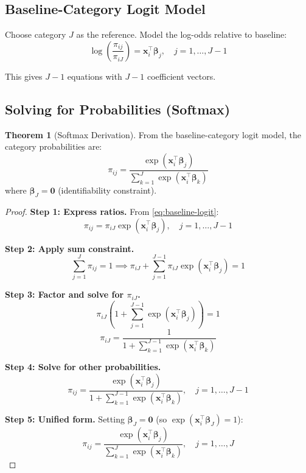 \documentclass[11pt,letterpaper]{article}
\theoremstyle{definition}
\newtheorem{theorem}{Theorem}[section]
\newcommand{\bb}{\boldsymbol{\beta}}
\begin{document}
\subsection{Baseline-Category Logit Model}

Choose category $J$ as the reference. Model the log-odds relative to baseline:
\begin{equation}
    \log\left(\frac{\pi_{ij}}{\pi_{iJ}}\right) = \mathbf{x}_i^\top \bb_j, \quad j = 1, \ldots, J-1
    \label{eq:baseline-logit}
\end{equation}

This gives $J-1$ equations with $J-1$ coefficient vectors.

\subsection{Solving for Probabilities (Softmax)}

\begin{theorem}[Softmax Derivation]
From the baseline-category logit model, the category probabilities are:
\begin{equation}
    \pi_{ij} = \frac{\exp(\mathbf{x}_i^\top \bb_j)}{\sum_{k=1}^{J} \exp(\mathbf{x}_i^\top \bb_k)}
    \label{eq:softmax}
\end{equation}
where $\bb_J = \mathbf{0}$ (identifiability constraint).
\end{theorem}

\begin{proof}
\textbf{Step 1: Express ratios.}
From \eqref{eq:baseline-logit}:
\begin{equation}
    \pi_{ij} = \pi_{iJ} \exp(\mathbf{x}_i^\top \bb_j), \quad j = 1, \ldots, J-1
\end{equation}

\textbf{Step 2: Apply sum constraint.}
\begin{equation}
    \sum_{j=1}^{J} \pi_{ij} = 1 \implies \pi_{iJ} + \sum_{j=1}^{J-1} \pi_{iJ} \exp(\mathbf{x}_i^\top \bb_j) = 1
\end{equation}

\textbf{Step 3: Factor and solve for $\pi_{iJ}$.}
\begin{equation}
    \pi_{iJ} \left(1 + \sum_{j=1}^{J-1} \exp(\mathbf{x}_i^\top \bb_j)\right) = 1
\end{equation}
\begin{equation}
    \pi_{iJ} = \frac{1}{1 + \sum_{k=1}^{J-1} \exp(\mathbf{x}_i^\top \bb_k)}
\end{equation}

\textbf{Step 4: Solve for other probabilities.}
\begin{equation}
    \pi_{ij} = \frac{\exp(\mathbf{x}_i^\top \bb_j)}{1 + \sum_{k=1}^{J-1} \exp(\mathbf{x}_i^\top \bb_k)}, \quad j = 1, \ldots, J-1
\end{equation}

\textbf{Step 5: Unified form.}
Setting $\bb_J = \mathbf{0}$ (so $\exp(\mathbf{x}_i^\top \bb_J) = 1$):
\begin{equation}
    \pi_{ij} = \frac{\exp(\mathbf{x}_i^\top \bb_j)}{\sum_{k=1}^{J} \exp(\mathbf{x}_i^\top \bb_k)}, \quad j = 1, \ldots, J
\end{equation}
\end{proof}
\end{document}
